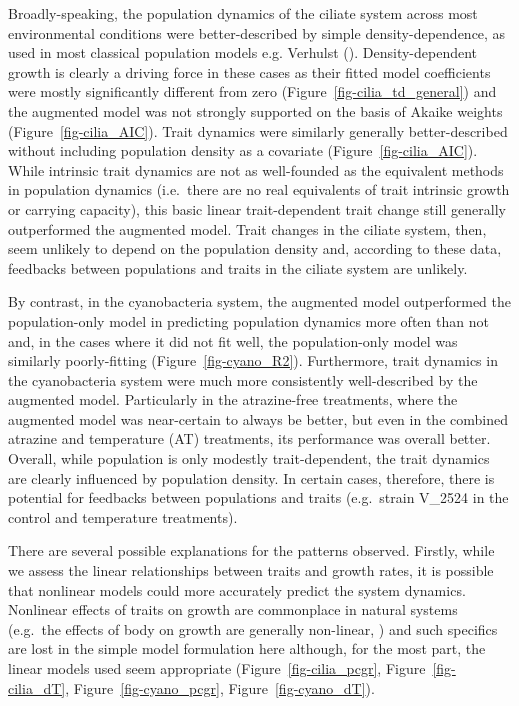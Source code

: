 \documentclass[
  letterpaper,
  DIV=11,
  numbers=noendperiod]{scrartcl}
\begin{document}
Broadly-speaking, the population dynamics of the ciliate system across
most environmental conditions were better-described by simple
density-dependence, as used in most classical population models e.g.
Verhulst (). Density-dependent growth
is clearly a driving force in these cases as their fitted model
coefficients were mostly significantly different from zero
(Figure~\ref{fig-cilia_td_general}) and the augmented model was not
strongly supported on the basis of Akaike weights
(Figure~\ref{fig-cilia_AIC}). Trait dynamics were similarly generally
better-described without including population density as a covariate
(Figure~\ref{fig-cilia_AIC}). While intrinsic trait dynamics are not as
well-founded as the equivalent methods in population dynamics
(i.e.~there are no real equivalents of trait intrinsic growth or
carrying capacity), this basic linear trait-dependent trait change still
generally outperformed the augmented model. Trait changes in the ciliate
system, then, seem unlikely to depend on the population density and,
according to these data, feedbacks between populations and traits in the
ciliate system are unlikely.

By contrast, in the cyanobacteria system, the augmented model
outperformed the population-only model in predicting population dynamics
more often than not and, in the cases where it did not fit well, the
population-only model was similarly poorly-fitting
(Figure~\ref{fig-cyano_R2}). Furthermore, trait dynamics in the
cyanobacteria system were much more consistently well-described by the
augmented model. Particularly in the atrazine-free treatments, where the
augmented model was near-certain to always be better, but even in the
combined atrazine and temperature (AT) treatments, its performance was
overall better. Overall, while population is only modestly
trait-dependent, the trait dynamics are clearly influenced by population
density. In certain cases, therefore, there is potential for feedbacks
between populations and traits (e.g.~strain V\_2524 in the control and
temperature treatments).

There are several possible explanations for the patterns observed.
Firstly, while we assess the linear relationships between traits and
growth rates, it is possible that nonlinear models could more accurately
predict the system dynamics. Nonlinear effects of traits on growth are
commonplace in natural systems (e.g.~the effects of body on growth are
generally non-linear,
) and such specifics are lost in the simple model formulation here
although, for the most part, the linear models used seem appropriate
(Figure~\ref{fig-cilia_pcgr}, Figure~\ref{fig-cilia_dT},
Figure~\ref{fig-cyano_pcgr}, Figure~\ref{fig-cyano_dT}).
\end{document}
